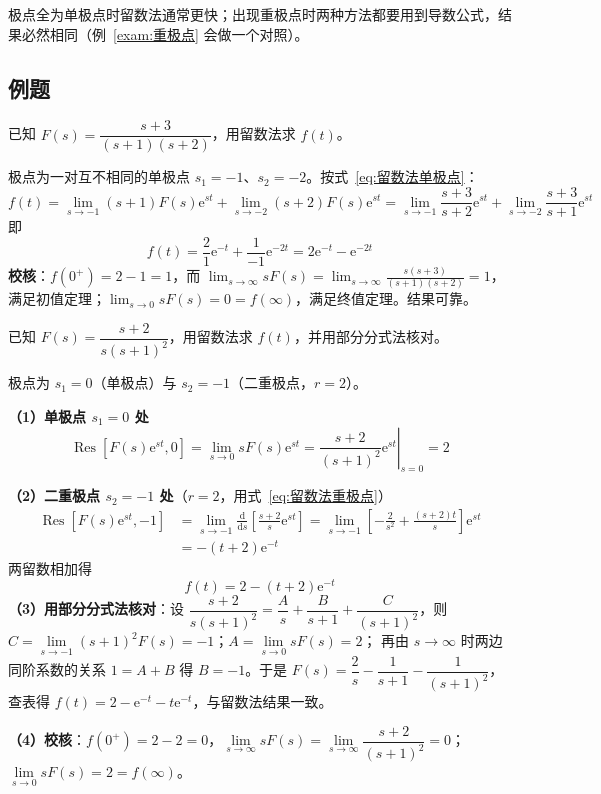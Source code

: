 极点全为单极点时留数法通常更快；出现重极点时两种方法都要用到导数公式，结果必然相同（例~\ref{exam:重极点} 会做一个对照）。

\subsection{例题}

\begin{longexample}[单实极点]
\label{exam:单极点}
已知 $F(s)=\dfrac{s+3}{(s+1)(s+2)}$，用留数法求 $f(t)$。
\begin{solution}
极点为一对互不相同的单极点 $s_1=-1$、$s_2=-2$。按式~\eqref{eq:留数法单极点}：
\[
f(t)=\lim_{s\to-1}(s+1)F(s)\mathrm{e}^{st}+\lim_{s\to-2}(s+2)F(s)\mathrm{e}^{st}
=\lim_{s\to-1}\frac{s+3}{s+2}\mathrm{e}^{st}+\lim_{s\to-2}\frac{s+3}{s+1}\mathrm{e}^{st}
\]
即
\[
f(t)=\frac{2}{1}\mathrm{e}^{-t}+\frac{1}{-1}\mathrm{e}^{-2t}=2\mathrm{e}^{-t}-\mathrm{e}^{-2t}
\]
\textbf{校核}：$f(0^{+})=2-1=1$，而 $\displaystyle\lim_{s\to\infty}sF(s)=\lim_{s\to\infty}\frac{s(s+3)}{(s+1)(s+2)}=1$，满足初值定理；$\displaystyle\lim_{s\to0}sF(s)=0=f(\infty)$，满足终值定理。结果可靠。
\end{solution}
\end{longexample}

\begin{longexample}[重极点]
\label{exam:重极点}
已知 $F(s)=\dfrac{s+2}{s(s+1)^{2}}$，用留数法求 $f(t)$，并用部分分式法核对。
\begin{solution}
极点为 $s_1=0$（单极点）与 $s_2=-1$（二重极点，$r=2$）。

\textbf{（1）单极点 $s_1=0$ 处}
\[
\operatorname{Res}\left[F(s)\mathrm{e}^{st},0\right]=\lim_{s\to0}sF(s)\mathrm{e}^{st}=\left.\frac{s+2}{(s+1)^{2}}\mathrm{e}^{st}\right|_{s=0}=2
\]

\textbf{（2）二重极点 $s_2=-1$ 处}（$r=2$，用式~\eqref{eq:留数法重极点}）
\[
\begin{aligned}
\operatorname{Res}\left[F(s)\mathrm{e}^{st},-1\right]
&=\lim_{s\to-1}\frac{\mathrm{d}}{\mathrm{d}s}\left[\frac{s+2}{s}\mathrm{e}^{st}\right]
=\lim_{s\to-1}\left[-\frac{2}{s^{2}}+\frac{(s+2)t}{s}\right]\mathrm{e}^{st}\\
&=-(t+2)\mathrm{e}^{-t}
\end{aligned}
\]
两留数相加得
\[
f(t)=2-(t+2)\mathrm{e}^{-t}
\]
\textbf{（3）用部分分式法核对}：设 $\dfrac{s+2}{s(s+1)^{2}}=\dfrac{A}{s}+\dfrac{B}{s+1}+\dfrac{C}{(s+1)^{2}}$，则
$C=\lim\limits_{s\to-1}(s+1)^{2}F(s)=-1$；$A=\lim\limits_{s\to0}sF(s)=2$；
再由 $s\to\infty$ 时两边同阶系数的关系 $1=A+B$ 得 $B=-1$。于是
$F(s)=\dfrac{2}{s}-\dfrac{1}{s+1}-\dfrac{1}{(s+1)^{2}}$，查表得 $f(t)=2-\mathrm{e}^{-t}-t\mathrm{e}^{-t}$，与留数法结果一致。

\textbf{（4）校核}：$f(0^{+})=2-2=0$，$\lim\limits_{s\to\infty}sF(s)=\lim\limits_{s\to\infty}\dfrac{s+2}{(s+1)^{2}}=0$；$\lim\limits_{s\to0}sF(s)=2=f(\infty)$。
\end{solution}
\end{longexample}


